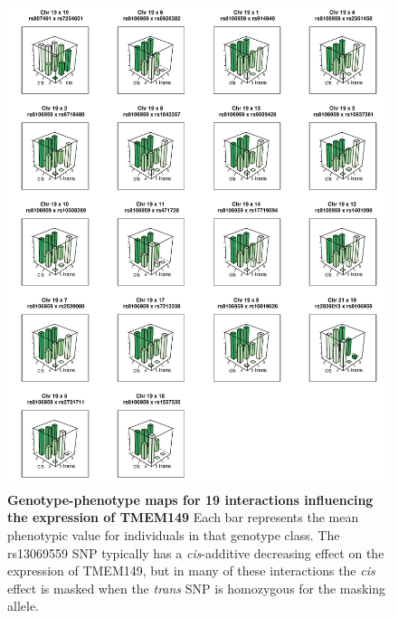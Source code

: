 \documentclass{article}
\begin{document}
\begin{figure}
	\centering
	\includegraphics[width=5in]{TMEM149_3D}
	\caption{\textbf{Genotype-phenotype maps for 19 interactions influencing the expression of TMEM149} Each bar represents the mean phenotypic value for individuals in that genotype class. The rs13069559 SNP typically has a \emph{cis}-additive decreasing effect on the expression of TMEM149, but in many of these interactions the \emph{cis} effect is masked when the \emph{trans} SNP is homozygous for the masking allele.}
	\label{fig:TMEM149_3D}
\end{figure}
\clearpage
\end{document}
